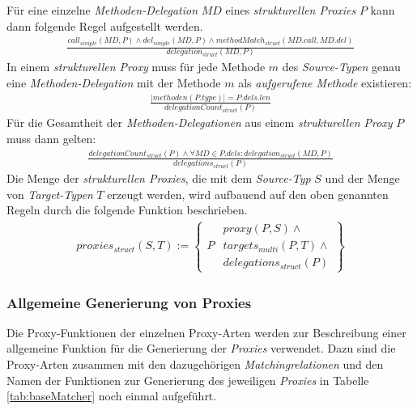 \noindent
Für eine einzelne \emph{Methoden-Delegation} $\mathit{MD}$ eines \emph{strukturellen Proxies} $P$ kann dann folgende Regel aufgestellt werden.
\begin{gather*}
\frac{\mathit{call_{simple}(MD, P)} \wedge \mathit{del_{simple}(MD, P)} \wedge \mathit{methodMatch_{struct}(MD.call, MD.del)}}
{\mathit{delegation_{struct}(MD, P)}}
\end{gather*}
\noindent
In einem \emph{strukturellen Proxy} muss für jede Methode $m$ des \emph{Source-Typen} genau eine \emph{Methoden-Delegation} mit der Methode $m$ als \emph{aufgerufene Methode} existieren:
\begin{gather*}
\frac{|\mathit{methoden(P.type)}| = P.dels.len}{delegationCount_{struct}(P)}
\end{gather*}
\noindent
Für die Gesamtheit der \emph{Methoden-Delegationen} aus einem \emph{strukturellen Proxy} $P$ muss dann gelten:
\begin{gather*}
\frac{\mathit{delegationCount_{struct}(P)} \wedge \forall \mathit{MD} \in P.dels: \mathit{delegation_{struct}(MD,P)}}
{\mathit{delegations_{struct}(P)}}
\end{gather*}
\noindent
Die Menge der \emph{strukturellen Proxies}, die mit dem \emph{Source-Typ} $S$ und der Menge von \emph{Target-Typen} $T$ erzeugt werden, wird aufbauend auf den oben genannten Regeln durch die folgende Funktion beschrieben.
\begin{gather*}
\mathit{proxies_{struct}(S,T)} := 
\left\{\begin{array}{l|l}
		& \mathit{proxy(P,S)}\wedge \mathit{ }\\
	P	& \mathit{targets_{multi}(P,T)} \wedge \mathit{ }\\
		& \mathit{delegations_{struct}(P)}  
		 \end{array}
\right\}
\end{gather*}

\subsubsection{Allgemeine Generierung von Proxies}
Die Proxy-Funktionen der einzelnen Proxy-Arten werden zur Beschreibung einer allgemeine Funktion für die Generierung der \emph{Proxies} verwendet. Dazu sind die Proxy-Arten zusammen mit den dazugehörigen \emph{Matchingrelationen} und den Namen der Funktionen zur Generierung des jeweiligen \emph{Proxies} in Tabelle \ref{tab:baseMatcher} noch einmal aufgeführt.

